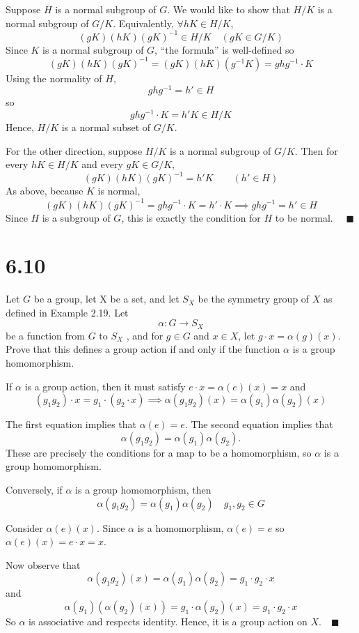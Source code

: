 \documentclass[12pt]{article}
\newcommand{\qed}{\quad \blacksquare}
\begin{document}
    \color{blue}
        Suppose $H$ is a normal subgroup of $G$. We would like to show that $H/K$ is a normal subgroup of $G/K$. Equivalently, $\forall hK \in H/K$,
        \[(gK)(hK)(gK)^{-1} \in H/K \quad (gK \in G/K)\]
        Since $K$ is a normal subgroup of $G$, ``the formula'' is well-defined so 
        \[(gK)(hK)(gK)^{-1} = (gK)(hK)(g^{-1}K) = ghg^{-1}\cdot K\]
        Using the normality of $H$, 
        \[ghg^{-1} = h' \in H\]
        so 
        \[ghg^{-1}\cdot K = h'K \in H/K\]
        Hence, $H/K$ is a normal subset of $G/K$.

        For the other direction, suppose $H/K$ is a normal subgroup of $G/K$. Then for every $hK \in H/K$ and every $gK \in G/K$, 
        \[(gK)(hK)(gK)^{-1} = h'K \qquad (h' \in H)\]
        As above, because $K$ is normal,
        \[(gK)(hK)(gK)^{-1} = ghg^{-1} \cdot K = h' \cdot K \implies ghg^{-1} = h' \in H\]
        Since $H$ is a subgroup of $G$, this is exactly the condition for $H$ to be normal. $\qed$
        
    \color{black}
\pagebreak

\section*{6.10}
Let $G$ be a group, let X be a set, and let $S_X$ be the symmetry group of $X$ as
defined in Example 2.19. Let
\[\alpha : G \to S_X\]
be a function from $G$ to $S_X$ , and for $g\in G$  and $x \in X$, let $g \cdot x = \alpha(g)(x)$. Prove that this defines a group action if and only if the function $\alpha$ is a group homomorphism.

    \color{blue}
        If $\alpha$ is a group action, then it must satisfy $e\cdot x = \alpha(e)(x) = x$ and 
        \[(g_1g_2)\cdot x = g_1\cdot(g_2\cdot x) \implies \alpha(g_1g_2)(x) = \alpha(g_1)\alpha(g_2)(x)\]

        The first equation implies that $\alpha(e) = e$. The second equation implies that 
        \[\alpha(g_1g_2) = \alpha(g_1)\alpha(g_2).\]
        These are precisely the conditions for a map to be a homomorphism, so $\alpha$ is a group homomorphism. 

        Conversely, if $\alpha$ is a group homomorphism, then 
        \[\alpha(g_1 g_2) = \alpha(g_1)\alpha(g_2) \quad g_1, g_2 \in G\]

        Consider $\alpha(e)(x)$. Since $\alpha$ is a homomorphism, $\alpha(e) = e$ so $\alpha(e)(x) = e\cdot x = x$. 

        Now observe that 
        \[\alpha(g_1g_2)(x) = \alpha(g_1)\alpha(g_2) = g_1 \cdot g_2 \cdot x\]
        and 
        \[\alpha(g_1)(\alpha(g_2)(x)) = g_1 \cdot \alpha(g_2)(x) = g_1\cdot g_2\cdot x\]
        So $\alpha$ is associative and respects identity. Hence, it is a group action on $X. \qed$ 
    \color{black}
\end{document}
